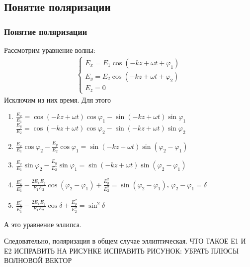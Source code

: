 \documentclass[10pt,pdf,hyperref={unicode}, dvipsnames, handout]{beamer}
\begin{document}
\begin{frame}
\subsection{Понятие поляризации}
	\frametitle{Понятие поляризации}
Рассмотрим уравнение волны: 
\begin{gather*} 
\begin{cases} 
E_x = E_1\cos\left(-kz+\omega t+\varphi_1\right) \\ 
E_y = E_2\cos\left(-kz+\omega t+\varphi_2\right) \\ 
E_z = 0 
\end{cases} 
\end{gather*} 
Исключим из них время. Для этого 
\begin{enumerate} 
\item %
$\frac{E_x}{E_1}=\cos(-{k}{z}+\omega t)\cos\varphi_1-\sin(-kz+\omega t)\sin\varphi_1$\\ %
$\frac{E_y}{E_2}=\cos(-kz+\omega t)\cos\varphi_2-\sin(-kz+\omega t)\sin\varphi_2$ %
\item %
$\frac{E_x}{E_1}\cos\varphi_2-\frac{E_y}{E_2}\cos\varphi_1=\sin(-kz+\omega t)\sin(\varphi_2-\varphi_1)$ 
\item %
$\frac{E_x}{E_1}\sin\varphi_2-\frac{E_y}{E_2}\sin\varphi_1=\sin(-kz+\omega t)\sin(\varphi_2-\varphi_1)$ 
\item %
$\frac{E_x^2}{E_1^2}-\frac{2E_xE_y}{E_1E_2}\cos(\varphi_2-\varphi_1)+\frac{E_y^2}{E_2^2}=\sin(\varphi_2-\varphi_1)$, 
$\varphi_2-\varphi_1=\delta$ 
\item $\frac{E_x^2}{E_1^2}-\frac{2E_xE_y}{E_1E_2}\cos\delta+\frac{E_y^2}{E_2^2}=\sin^2\delta$ 
\end{enumerate} 

А это уравнение эллипса.

Следовательно, поляризация в общем случае эллиптическая. ЧТО ТАКОЕ Е1 И Е2 ИСПРАВИТЬ НА РИСУНКЕ ИСПРАВИТЬ РИСУНОК:
УБРАТЬ ПЛЮСЫ
ВОЛНОВОЙ ВЕКТОР

\end{frame}

\end{document}
